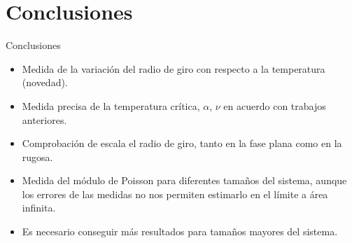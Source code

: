 \documentclass[xcolor=dvipsnames]{beamer}
\begin{document}
\section{Conclusiones}
\begin{frame}{Conclusiones}
\begin{itemize}
\item Medida de la variación del radio de giro con respecto a la temperatura (novedad).
\item Medida precisa de la temperatura crítica, $\alpha$, $\nu$ en acuerdo con
  trabajos anteriores.
\item Comprobación de escala el radio de giro, tanto en la fase plana como en la
rugosa.
\item Medida del módulo de Poisson para diferentes tamaños del sistema, aunque los
errores de las medidas no nos permiten estimarlo en el límite a área infinita.
\item Es necesario conseguir más resultados para tamaños mayores del sistema.
\end{itemize}
\end{frame}
\end{document}
